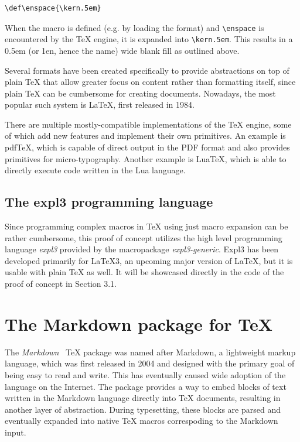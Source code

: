 \documentclass[
  digital,     %
  oneside,     %
  nosansbold,  %
  nocolorbold, %
  lof,         %
  nolot,       %
]{fithesis4}
\newcommand\macro[1]{\texttt{\textbackslash{}{#1}}}
\begin{document}
\noindent
\lstset{language=[plain]TeX}
\begin{lstlisting}
\def\enspace{\kern.5em}
\end{lstlisting}

When the macro is defined (e.g. by loading the format) and \macro{enspace} is encountered by the \TeX{} engine, it is expanded into \macro{kern.5em}. This results in a 0.5em (or 1en, hence the name) wide blank fill as outlined above.

Several formats have been created specifically to provide abstractions on top of plain \TeX{} that allow greater focus on content rather than formatting itself, since plain \TeX{} can be cumbersome for creating documents. Nowadays, the most popular such system is \LaTeX{}, first released in 1984.

There are multiple mostly-compatible implementations of the \TeX{} engine, some of which add new features and implement their own primitives. An example is pdf\TeX{}, which is capable of direct output in the PDF format and also provides primitives for micro-typography\cite{thanh01}. Another example is Lua\TeX{}, which is able to directly execute code written in the Lua language.

\subsection{The expl3 programming language}
Since programming complex macros in \TeX{} using just macro expansion can be rather cumbersome, this proof of concept utilizes the high level programming language \emph{expl3} provided by the macropackage \emph{expl3-generic}. Expl3 has been developed primarily for \LaTeX{}3, an upcoming major version of \LaTeX{}, but it is usable with plain \TeX{} as well. It will be showcased directly in the code of the proof of concept in Section 3.1.

\section{The Markdown package for \TeX{}}
The \emph{Markdown}~\cite{cstug-markdown} \TeX{} package was named after Markdown, a lightweight markup language, which was first released in 2004 and designed with the primary goal of being easy to read and write. This has eventually caused wide adoption of the language on the Internet. The package provides a way to embed blocks of text written in the Markdown language directly into \TeX{} documents, resulting in another layer of abstraction. During typesetting, these blocks are parsed and eventually expanded into native \TeX{} macros correspoding to the Markdown input. 
\end{document}
